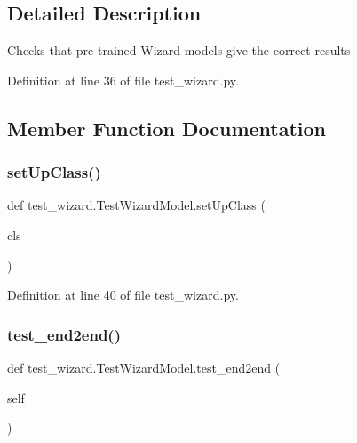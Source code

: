 \subsection{Detailed Description}
\begin{DoxyVerb}Checks that pre-trained Wizard models give the correct results\end{DoxyVerb}
 

Definition at line 36 of file test\+\_\+wizard.\+py.



\subsection{Member Function Documentation}
\mbox{\label{classtest__wizard_1_1TestWizardModel_a2b3661d3b4129ecb38ac3c5fe47232e1}} 
\subsubsection{\texorpdfstring{set\+Up\+Class()}{setUpClass()}}
{\footnotesize\ttfamily def test\+\_\+wizard.\+Test\+Wizard\+Model.\+set\+Up\+Class (\begin{DoxyParamCaption}\item[{}]{cls }\end{DoxyParamCaption})}



Definition at line 40 of file test\+\_\+wizard.\+py.

\mbox{\label{classtest__wizard_1_1TestWizardModel_a25fdc3cdc736bc273eaeed0019dfaf5b}} 
\subsubsection{\texorpdfstring{test\+\_\+end2end()}{test\_end2end()}}
{\footnotesize\ttfamily def test\+\_\+wizard.\+Test\+Wizard\+Model.\+test\+\_\+end2end (\begin{DoxyParamCaption}\item[{}]{self }\end{DoxyParamCaption})}



